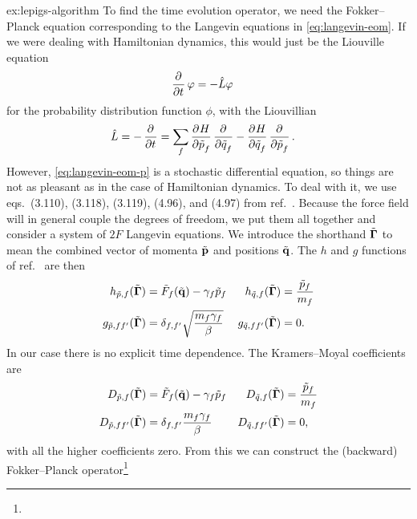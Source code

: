 \begin{DefAnswer}{ex:lepigs-algorithm}
	To find the time evolution operator, we need the Fokker--Planck equation corresponding to the Langevin equations in \cref{eq:langevin-eom}.
	If we were dealing with Hamiltonian dynamics, this would just be the Liouville equation~\cite[32]{zwanzig2001nonequilibrium}
	\begin{align}
		\dpd{}{t} \phi
		&= -\hat{L} \phi
	\end{align}
	for the probability distribution function $\phi$, with the Liouvillian
	\begin{align}
		\hat{L}
		&= -\dpd{}{t}
		= \sum_f \dpd{H}{\nm{p}_f} \dpd{}{\nm{q}_f} - \dpd{H}{\nm{q}_f} \dpd{}{\nm{p}_f}.
	\end{align}
	However, \cref{eq:langevin-eom-p} is a stochastic differential equation, so things are not as pleasant as in the case of Hamiltonian dynamics.
	To deal with it, we use eqs.~(3.110), (3.118), (3.119), (4.96), and (4.97) from ref.~\cite[54-55,83]{risken1984fokker}.
	Because the force field will in general couple the degrees of freedom, we put them all together and consider a system of $2 F$ Langevin equations.
	We introduce the shorthand $\tilde{\bm{\mathbf{\Gamma}}}$ to mean the combined vector of momenta $\tilde{\bm{\mathbf{p}}}$ and positions $\tilde{\bm{\mathbf{q}}}$.
	The $h$ and $g$ functions of ref.~\cite{risken1984fokker} are then
	\begin{subequations}
	\begin{align}
		h_{\tilde{p},f}(\tilde{\bm{\mathbf{\Gamma}}})
		&= \tilde{F}_f(\tilde{\bm{\mathbf{q}}}) - \gamma_f \tilde{p}_f &
		h_{\tilde{q},f}(\tilde{\bm{\mathbf{\Gamma}}})
		&= \frac{\tilde{p}_f}{m_f} \\
		g_{\tilde{p},ff'}(\tilde{\bm{\mathbf{\Gamma}}})
		&= \delta_{f,f'} \sqrt{\frac{m_f \gamma_f}{\beta}} &
		g_{\tilde{q},ff'}(\tilde{\bm{\mathbf{\Gamma}}})
		&= 0.
	\end{align}
	\end{subequations}
	In our case there is no explicit time dependence.
	The Kramers--Moyal coefficients are
	\begin{subequations}
	\begin{align}
		D_{\tilde{p},f}(\tilde{\bm{\mathbf{\Gamma}}})
		&= \tilde{F}_f(\tilde{\bm{\mathbf{q}}}) - \gamma_f \tilde{p}_f &
		D_{\tilde{q},f}(\tilde{\bm{\mathbf{\Gamma}}})
		&= \frac{\tilde{p}_f}{m_f} \\
		D_{\tilde{p},ff'}(\tilde{\bm{\mathbf{\Gamma}}})
		&= \delta_{f,f'} \frac{m_f \gamma_f}{\beta} &
		D_{\tilde{q},ff'}(\tilde{\bm{\mathbf{\Gamma}}})
		&= 0,
	\end{align}
	\end{subequations}
	with all the higher coefficients zero.
	From this we can construct the (backward) Fokker--Planck operator\footnote{
}
\end{DefAnswer}
